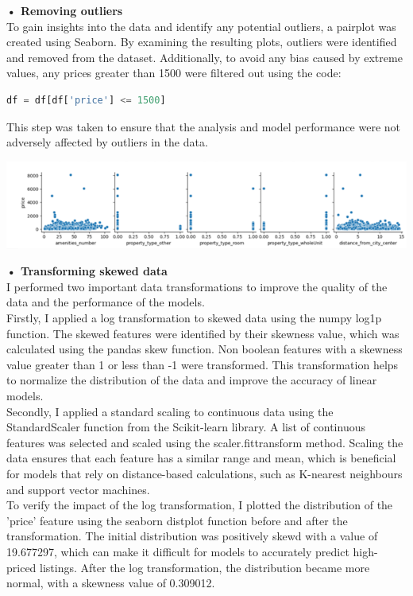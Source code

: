 \documentclass{article}
\begin{document}
\textbf{• Removing outliers}\\
To gain insights into the data and identify any potential outliers, a pairplot was created using Seaborn. 
By examining the resulting plots, outliers were identified and removed from the dataset. Additionally, to avoid any bias caused by extreme values, any prices greater than 1500 were filtered out using the code: 
\begin{lstlisting}[language=Python, caption=Python code snippet for missing values]
df = df[df['price'] <= 1500]
\end{lstlisting} 
This step was taken to ensure that the analysis and model performance were not adversely affected by outliers in the data.
\newpage
\begin{center}
    \includegraphics{outliers.png}
    \captionsetup{justification=centering}
\end{center}
\vspace{.5cm}
\textbf{• Transforming skewed data}\\
I performed two important data transformations to improve the quality of the data and the performance of the models.\\ Firstly, I applied a log transformation to skewed data using the numpy log1p function. The skewed features were identified by their skewness value, which was calculated using the pandas skew function. Non boolean features with a skewness value greater than 1 or less than -1 were transformed. This transformation helps to normalize the distribution of the data and improve the accuracy of linear models.\\
Secondly, I applied a standard scaling to continuous data using the StandardScaler function from the Scikit-learn library. A list of continuous features was selected and scaled using the scaler.fit\textunderscore transform method. Scaling the data ensures that each feature has a similar range and mean, which is beneficial for models that rely on distance-based calculations, such as K-nearest neighbours and support vector machines.\\
To verify the impact of the log transformation, I plotted the distribution of the 'price' feature using the seaborn distplot function before and after the transformation. The initial distribution was positively skewd with a value of 19.677297, which can make it difficult for models to accurately predict high-priced listings. After the log transformation, the distribution became more normal, with a skewness value of 0.309012.
\end{document}
